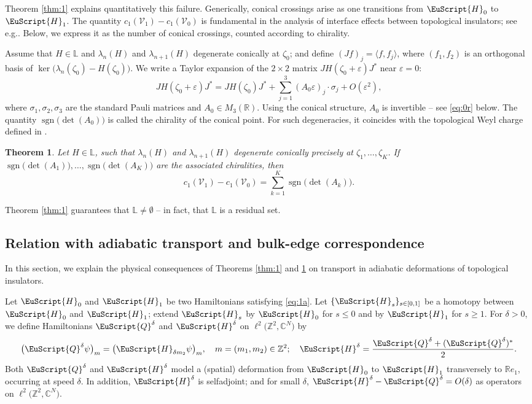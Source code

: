 \documentclass[10pt]{amsart}
\let\pazocal\EuScript
\newtheorem{theorem}[thm]{Theorem}
\theoremstyle{definition}
\DeclareMathOperator{\sgn}{sgn}
\newcommand{\QQ}{{\pazocal{Q}}}
\newcommand{\HH}{\pazocal{H}}
\newcommand{\VVV}{{\mathscr{V}}}
\newcommand{\C}{\mathbb{C}}
\newcommand{\Ll}{\mathbb{L}}
\newcommand{\R}{\mathbb{R}}
\newcommand{\Z}{\mathbb{Z}}
\let\epsi\varepsilon
\newcommand{\lr}[1]{\langle #1 \rangle}
\providecommand{\eg}{e.g.}\providecommand{\ie}{i.e.}\providecommand{\etc}{etc.}\providecommand{\resp}{resp.}\providecommand{\cf}{cf.}
\let\Subsection\subsection\let\Subsubsection\subsubsection
\begin{document}
Theorem \ref{thm:1} explains quantitatively this failure. Generically, conical crossings arise as one transitions from $\HH_0$ to $\HH_1$. The quantity $c_1(\VVV_1) - c_1(\VVV_0)$ is fundamental in the analysis of interface effects between topological insulators; see \eg \cite{RH08,B19b,D19c}. Below, we express it as the number of conical crossings, counted according to chirality.

Assume that $H \in \Ll$ and $\lambda_n(H)$ and $\lambda_{n+1}(H)$ degenerate conically at $\zeta_0$; and define $(J f)_j = \lr{f, f_j}$, where $(f_1,f_2)$ is an orthogonal basis of $\ker\bigl(\lambda_n(\zeta_0) -H(\zeta_0)\bigr)$. We write a Taylor expansion of the $2 \times 2$ matrix $J H(\zeta_0+\epsi) J^*$ near $\epsi = 0$:
\begin{equation}\label{eq:1g}
J H(\zeta_0+\epsi) J^* = J H(\zeta_0) J^* + \sum_{j=1}^3 (A_0 \epsi)_j \cdot \sigma_j + O(\epsi^2),
\end{equation}
where $\sigma_1, \sigma_2, \sigma_3$ are the standard Pauli matrices and $A_0 \in M_3(\R)$.
Using the conical structure, $A_0$ is invertible -- see \eqref{eq:0r} below. The quantity $\sgn\bigl(\det(A_0) \bigr)$ is called the chirality of the conical point. For such degeneracies, it coincides with the topological Weyl charge defined in \cite{MP14}.


\begin{theorem}\label{thm:3} Let $H \in \Ll$, such that $\lambda_n(H)$ and $\lambda_{n+1}(H)$ degenerate conically precisely at $\zeta_1, \dots, \zeta_K$. If $\sgn\bigl(\det(A_1) \bigr), \dots, \sgn\bigl(\det(A_K) \bigr)$ are the associated chiralities, then
\begin{equation}\label{eq:3k}
c_1(\VVV_1) - c_1(\VVV_0) = \sum_{k=1}^K \sgn\bigl(\det(A_k) \bigr).
\end{equation}
\end{theorem}


Theorem \ref{thm:1} guarantees that $\Ll \neq \emptyset$ -- in fact, that $\Ll$ is a residual set.

\Subsection{Relation with adiabatic transport and bulk-edge correspondence} In this section, we explain the physical consequences of Theorems \ref{thm:1} and \ref{thm:3} on transport in adiabatic deformations of topological insulators.

Let $\HH_0$ and $\HH_1$ be two Hamiltonians satisfying \eqref{eq:1a}. Let $\{\HH_s\}_{s\in [0,1]}$ be a homotopy between $\HH_0$ and $\HH_1$; extend $\HH_s$ by $\HH_0$ for $s \leq 0$ and by $\HH_1$ for $s \geq 1$. For $\delta > 0$, we define Hamiltonians $\QQ^\delta$ and $\HH^{\delta}$ on $\ell^2\bigl(\Z^2,\C^N\bigr)$ by
\begin{equation}\label{eq:3a}
\bigl(\QQ^\delta \psi\bigr)_m = \bigl(\HH_{\delta m_2} \psi\bigr)_m, \quad m = (m_1,m_2) \in \Z^2;
\quad
\HH^\delta = \dfrac{\QQ^\delta + (\QQ^\delta)^*}{2}.
\end{equation}
Both $\QQ^\delta$ and $\HH^\delta$ model a (spatial) deformation from $\HH_0$ to $\HH_1$ transversely to $\R e_1$, occurring at speed $\delta$. In addition, $\HH^\delta$ is selfadjoint; and for small $\delta$, $\HH^\delta - \QQ^\delta = O(\delta)$ as operators on $\ell^2\bigl(\Z^2,\C^N\bigr)$.
\end{document}

